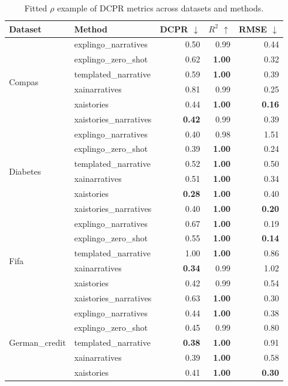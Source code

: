 \begin{table}[h!]
\centering
\caption{Fitted $\rho$ example of DCPR metrics across datasets and methods.}
\label{tab:fitted_dcpr}
\begin{tabular}{llrrr}
\toprule
Dataset & Method & DCPR $\downarrow$ & $R^2$ $\uparrow$ & RMSE $\downarrow$ \\
\midrule
\multirow{6}{*}{Compas} & explingo_narratives & 0.50 & 0.99 & 0.44 \\
 & explingo_zero_shot & 0.62 & \textbf{1.00} & 0.32 \\
 & templated_narrative & 0.59 & \textbf{1.00} & 0.39 \\
 & xainarratives & 0.81 & 0.99 & 0.25 \\
 & xaistories & 0.44 & \textbf{1.00} & \textbf{0.16} \\
 & xaistories_narratives & \textbf{0.42} & 0.99 & 0.39 \\
\midrule
\multirow{6}{*}{Diabetes} & explingo_narratives & 0.40 & 0.98 & 1.51 \\
 & explingo_zero_shot & 0.39 & \textbf{1.00} & 0.24 \\
 & templated_narrative & 0.52 & \textbf{1.00} & 0.50 \\
 & xainarratives & 0.51 & \textbf{1.00} & 0.34 \\
 & xaistories & \textbf{0.28} & \textbf{1.00} & 0.40 \\
 & xaistories_narratives & 0.40 & \textbf{1.00} & \textbf{0.20} \\
\midrule
\multirow{6}{*}{Fifa} & explingo_narratives & 0.67 & \textbf{1.00} & 0.19 \\
 & explingo_zero_shot & 0.55 & \textbf{1.00} & \textbf{0.14} \\
 & templated_narrative & 1.00 & \textbf{1.00} & 0.86 \\
 & xainarratives & \textbf{0.34} & 0.99 & 1.02 \\
 & xaistories & 0.42 & 0.99 & 0.54 \\
 & xaistories_narratives & 0.63 & \textbf{1.00} & 0.30 \\
\midrule
\multirow{6}{*}{German_credit} & explingo_narratives & 0.44 & \textbf{1.00} & 0.38 \\
 & explingo_zero_shot & 0.45 & 0.99 & 0.80 \\
 & templated_narrative & \textbf{0.38} & \textbf{1.00} & 0.91 \\
 & xainarratives & 0.39 & \textbf{1.00} & 0.58 \\
 & xaistories & 0.41 & \textbf{1.00} & \textbf{0.30} \\

\end{tabular}
\end{table}
